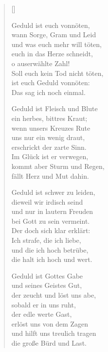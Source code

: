 \begin{multicols}{2}
\settowidth{\versewidth}{Geduld ist Fleisch und Blute}
\begin{verse}[\versewidth]


 Geduld ist euch vonnöten,\\
wann Sorge, Gram und Leid\\
und was euch mehr will töten,\\
euch in das Herze schneidt,\\
o auserwählte Zahl!\\
Soll euch kein Tod nicht töten,\\
ist euch Geduld vonnöten:\\
Das sag ich noch einmal.

 Geduld ist Fleisch und Blute\\
ein herbes, bittres Kraut;\\
wenn unsers Kreuzes Rute\\
uns nur ein wenig draut,\\
erschrickt der zarte Sinn.\\
Im Glück ist er verwegen,\\
kommt aber Sturm und Regen,\\
fällt Herz und Mut dahin.

 Geduld ist schwer zu leiden,\\
dieweil wir irdisch seind\\
und nur in lautern Freuden\\
bei Gott zu sein vermeint.\\
Der doch sich klar erklärt:\\
Ich strafe, die ich liebe,\\
und die ich hoch betrübe,\\
die halt ich hoch und wert.

 Geduld ist Gottes Gabe\\
und seines Geistes Gut,\\
der zeucht und löst uns abe,\\
sobald er in uns ruht,\\
der edle werte Gast,\\
erlöst uns von dem Zagen\\
und hilft uns treulich tragen\\
die große Bürd und Last.


\end{verse}
\end{multicols}
